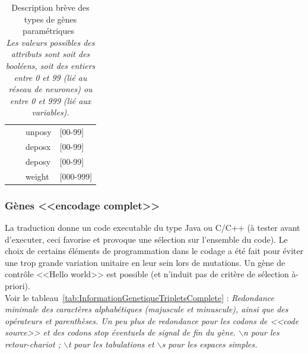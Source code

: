 \documentclass[11pt,twoside,a4paper]{article}
\begin{document}
\begin{table}[h]
\begin{center}
\begin{scriptsize}
\begin{tabular}{|p{}|c|p{}|p{}|}
								&				&	unposy		& [00-99] \\
	\cline{3-4} %
								&				&	deposx		& [00-99] \\
	\cline{3-4} %
								&				&	deposy		& [00-99] \\
	\cline{3-4} %
								&				&	weight		& [000-999] \\
	\hline \hline
	\end{tabular}
	\end{scriptsize} \end{center}
	\caption[Description br{\`e}ve des types de g{\`e}nes param{\'e}triques]
		{Description br{\`e}ve des types de g{\`e}nes param{\'e}triques~\\
		\emph{Les valeurs possibles des attributs sont soit des bool{\'e}ens, soit des entiers entre 0 et 99 (li{\'e} au r{\'e}seau de neurones) ou entre 0 et 999 (li{\'e} aux variables). }}
	\label{tab:briefDescriptionGeneTypes}
\end{table}


\subsubsection{G{\`e}nes <<encodage complet>>}

La traduction donne un code executable du type Java ou C/C++ ({\`a} tester avant d'executer, ceci favorise et provoque une s{\'e}lection sur l'ensemble du code). Le choix de certains {\'e}l{\'e}ments de programmation dans le codage a {\'e}t{\'e} fait pour {\'e}viter une trop grande variation unitaire en leur sein lors de mutations. Un g{\`e}ne de contr{\^o}le <<Hello world>> est possible (et n'induit pas de crit{\`e}re de s{\'e}lection {\`a}-priori).~\\

Voir le tableau~\ref{tab:InformationGenetiqueTripletsComplete} : \emph{Redondance minimale des caract{\`e}res alphab{\'e}tiques (majuscule et minuscule), ainsi que des op{\'e}rateurs et parenth{\`e}ses. Un peu plus de redondance pour les codons de <<code source>> et des codons stop {\'e}ventuels de signal de fin du g{\`e}ne. $\backslash$n pour les retour-chariot ; $\backslash$t pour les tabulations et $\backslash$s pour les espaces simples. }

\end{document}
